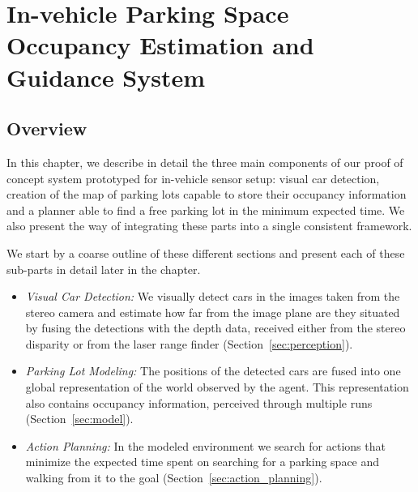 
\newcommand\Bx{x}
\newcommand\Bm{m}
\def\v{\vm{v}}
\newcommand\vm[1]{\bm{\mathrm{#1}}}
\renewcommand{\v}{{\mbox{a}^i}}
\newcommand{\z}{z_{t}}
\newcommand{\y}{z_{1:t-1}}

\chapter{In-vehicle Parking Space Occupancy Estimation and Guidance System}
\label{cha:our_approach}

\section{Overview} %
\label{sec:overview}

In this chapter, we describe in detail the three main components of our proof
of concept system prototyped for in-vehicle sensor setup: visual car
detection, creation of the map of parking lots capable to store their
occupancy information and a planner able to find a free parking lot in the
minimum expected time. We also present the way of integrating these parts into
a single consistent framework.

We start by a coarse outline of these different sections and present each of
these sub-parts in detail later in the chapter.

\begin{itemize}

\item \emph{Visual Car Detection:}  We visually detect cars in the images taken from the
stereo camera and estimate how far from the image plane are they situated by
fusing the detections with the depth data, received either from the stereo
disparity or from the laser range finder (Section~\ref{sec:perception}).

\item \emph{Parking Lot Modeling:}  The positions of the detected cars are
fused into one global representation of the world observed by the agent. This
representation also contains occupancy information, perceived through multiple
runs (Section~\ref{sec:model}).

\item \emph{Action Planning:}  In the modeled environment we search for actions that
minimize the expected time spent on searching for a parking space and walking
from it to the goal (Section~\ref{sec:action_planning}).

\end{itemize}


